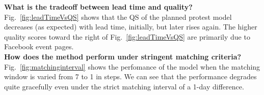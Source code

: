 \vspace{-0.5em}
\noindent
{\bf What is the tradeoff between lead time and quality?}
Fig.~\ref{fig:leadTimeVsQS} shows that the QS of the planned protest model decreases (as expected) with lead time, initially, but
later rises again. The higher quality scores toward the right of Fig.~\ref{fig:leadTimeVsQS} are primarily due to
Facebook event pages.\\

\vspace{-0.5em}
\noindent
{\bf How does the method perform under stringent matching criteria?}
Fig.~\ref{fig:matchinginterval} shows the perfomance of the model when the matching window is varied from 7 to 1 in steps. 
We can see that the performance degrades quite gracefully even under the strict matching interval of a 1-day difference.\\

